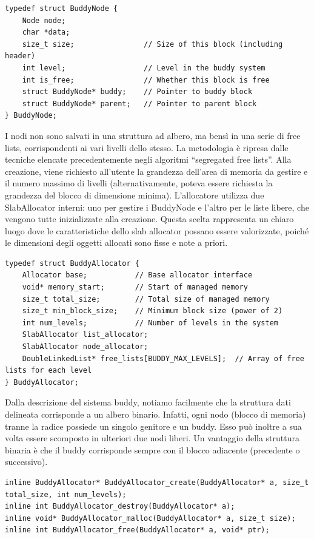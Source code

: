 \begin{lstlisting}
typedef struct BuddyNode {
    Node node;
    char *data;
    size_t size;                // Size of this block (including header)
    int level;                  // Level in the buddy system
    int is_free;                // Whether this block is free
    struct BuddyNode* buddy;    // Pointer to buddy block
    struct BuddyNode* parent;   // Pointer to parent block
} BuddyNode;
\end{lstlisting}

I nodi non sono salvati in una struttura ad albero, ma bensì in una serie di free lists, corrispondenti ai vari livelli dello stesso. La metodologia è ripresa dalle tecniche elencate precedentemente negli algoritmi “segregated free lists”. Alla creazione, viene richiesto all’utente la grandezza dell’area di memoria da gestire e il numero massimo di livelli (alternativamente, poteva essere richiesta la grandezza del blocco di dimensione minima). L'allocatore utilizza due SlabAllocator interni: uno per gestire i BuddyNode e l'altro per le liste libere, che vengono tutte inizializzate alla creazione. Questa scelta rappresenta un chiaro luogo dove le caratteristiche dello slab allocator possano essere valorizzate, poiché le dimensioni degli oggetti allocati sono fisse e note a priori.

\begin{lstlisting}
typedef struct BuddyAllocator {
    Allocator base;           // Base allocator interface
    void* memory_start;       // Start of managed memory
    size_t total_size;        // Total size of managed memory
    size_t min_block_size;    // Minimum block size (power of 2)
    int num_levels;           // Number of levels in the system
    SlabAllocator list_allocator;
    SlabAllocator node_allocator;
    DoubleLinkedList* free_lists[BUDDY_MAX_LEVELS];  // Array of free lists for each level
} BuddyAllocator;
\end{lstlisting}

Dalla descrizione del sistema buddy, notiamo facilmente che la struttura dati delineata corrisponde a un albero binario. Infatti, ogni nodo (blocco di memoria) tranne la radice possiede un singolo genitore e un buddy. Esso può inoltre a sua volta essere scomposto in ulteriori due nodi liberi. Un vantaggio della struttura binaria è che il buddy corrisponde sempre con il blocco adiacente (precedente o successivo).

\begin{lstlisting}
inline BuddyAllocator* BuddyAllocator_create(BuddyAllocator* a, size_t total_size, int num_levels);
inline int BuddyAllocator_destroy(BuddyAllocator* a);
inline void* BuddyAllocator_malloc(BuddyAllocator* a, size_t size);
inline int BuddyAllocator_free(BuddyAllocator* a, void* ptr);
\end{lstlisting}

